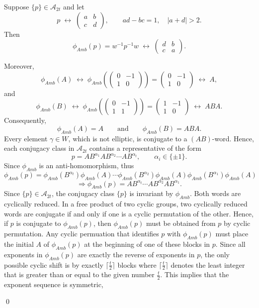 \documentclass[a4paper,12pt]{amsart}
\renewenvironment{proof}{{\bfseries Proof.}}{\qed}
\numberwithin{equation}{section}
\theoremstyle{definition}
\newcommand{\imp}{\Rightarrow}
\numberwithin{equation}{section}
\begin{document}
    \begin{proof}
    Suppose $\{p\}\in \mathscr{A}_{2t}$ and let
$$
p \;\longleftrightarrow\;
\begin{pmatrix}
a & b\\
c & d
\end{pmatrix},
\qquad ad-bc=1,\quad |a+d|>2.
$$
Then
$$
\phi_{Amb}(p)=w^{-1}p^{-1}w
\;\longleftrightarrow\;
\begin{pmatrix}
d & b \\
c & a
\end{pmatrix}.
$$

Moreover,
$$
\phi_{Amb}(A)
\;\longleftrightarrow\;
\phi_{Amb}\!\left(
\begin{pmatrix}
0 & -1\\
1 & 0
\end{pmatrix}\right)
=
\begin{pmatrix}
0 & -1\\
1 & 0
\end{pmatrix}
\;\longleftrightarrow\; A,
$$
and
$$
\phi_{Amb}(B)
\;\longleftrightarrow\;
\phi_{Amb}\!\left(
\begin{pmatrix}
0 & -1\\
1 & 1
\end{pmatrix}\right)
=
\begin{pmatrix}
1 & -1\\
1 & 0
\end{pmatrix}
\;\longleftrightarrow\; ABA.
$$
Consequently,
$$
\phi_{Amb}(A)=A
\qquad\text{and}\qquad
\phi_{Amb}(B)=ABA.
$$
Every element $\gamma \in W$, which is not elliptic, is conjugate to a $(AB)$-word. Hence, each conjugacy class in $\mathscr{A}_{2t}$ contains a representative of the form
\[
p = AB^{\alpha_1} AB^{\alpha_2} \cdots AB^{\alpha_{t}}, \qquad \alpha_i \in \{\pm 1\}.
\]
Since $\phi_{Amb}$ is an anti-homomorphism, thus
$$
\phi_{Amb}(p) = \phi_{Amb}(B^{\alpha_{t}})\phi_{Amb}( A)\cdots  \phi_{Amb}(B^{\alpha_2})\phi_{Amb}(A)\phi_{Amb}(B^{\alpha_1})\phi_{Amb}(A)$$
$$\imp \phi_{Amb}(p)= AB^{\alpha_{t}} \cdots AB^{\alpha_2} AB^{\alpha_1}.
$$
Since $\{p\}\in \mathscr{A}_{2t}$, the conjugacy class $\{p\}$ is invariant by $\phi_{Amb}$. Both words are cyclically reduced. In a free product of two cyclic groups, two cyclically reduced words are conjugate if and only if one is a cyclic permutation of the other. Hence, if $p$ is conjugate to $\phi_{Amb}(p)$, then $\phi_{Amb}(p)$ must be obtained from $p$ by cyclic permutation. Any cyclic permuation that identifies $p$ with $\phi_{Amb}(p)$ must place the initial $A$ of $\phi_{Amb}(p)$ at the beginning of one of these blocks in $p$. Since all exponents in $\phi_{Amb}(p)$ are exactly the reverse of exponents in $p$, the only possible cyclic shift is by exactly $\lceil\frac{t}{2}\rceil$ blocks where $\lceil \frac{t}{2} \rceil$ denotes the least integer that is greater than or equal to the given number $\frac{t}{2}$. This implies that the exponent sequence is symmetric,

\end{proof}
\end{document}
